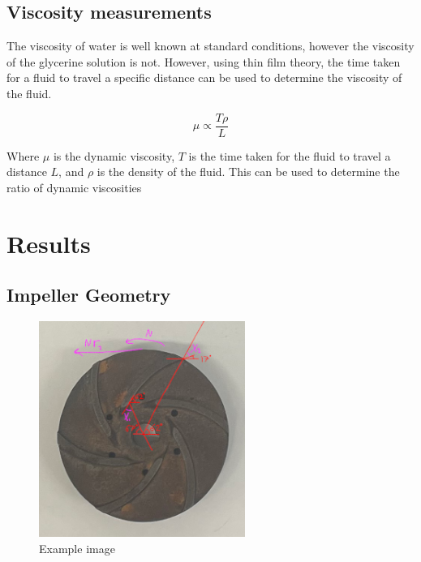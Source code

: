 \documentclass{article}
\begin{document}



\subsection{Viscosity measurements}

The viscosity of water is well known at standard conditions, however the viscosity of the glycerine solution is not.
However, using thin film theory, the time taken for a fluid to travel a specific distance can be used to determine the viscosity of the fluid.

\begin{equation}
    \mu \propto \frac{T\rho}{L}
\end{equation}
    
Where $\mu$ is the dynamic viscosity, $T$ is the time taken for the fluid to travel a distance $L$, and $\rho$ is the density of the fluid.
This can be used to determine the ratio of dynamic viscosities
\section{Results}


\subsection{Impeller Geometry}

\begin{figure}[H]
    \centering
    \includegraphics[width=0.6\textwidth]{impeller_annotations.png}
    \caption{Example image}
    \label{fig:impeller_annotations}
\end{figure}
\end{document}
